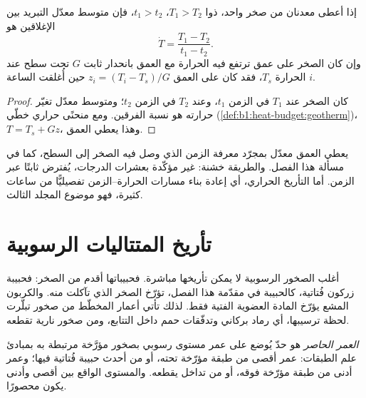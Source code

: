 \begin{proposition}\label{prop:b1:radiometric-methods:cooling}
إذا أعطى معدنان من صخر واحد، ذوا  $T_1 > T_2$،  $t_1 > t_2$، فإن متوسط معدّل التبريد بين الإغلاقين هو
\[
  \dot T = \frac{T_1 - T_2}{t_1 - t_2}.
\]
وإن كان الصخر على عمق ترتفع فيه الحرارة مع العمق بانحدار ثابت $G$ تحت سطح عند الحرارة $T_s$، فقد كان على العمق $z_i
= (T_i - T_s)/G$ حين أُغلقت الساعة $i$.
\end{proposition}

\begin{proof}
كان الصخر عند $T_1$ في الزمن $t_1$، وعند $T_2$ في الزمن $t_2$؛ ومتوسط معدّل تغيّر حرارته هو نسبة الفرقين. ومع منحنًى حراري خطّي (\cref{def:b1:heat-budget:geotherm})، $T = T_s + G z$، وهذا يعطي العمق.
\end{proof}

يعطي العمق معدّل  بمجرّد معرفة الزمن الذي وصل فيه الصخر إلى السطح، كما في مسألة هذا الفصل. والطريقة خشنة:  غير مؤكّدة بعشرات الدرجات،  يُفترض ثابتًا عبر الزمن. أما التأريخ الحراري، أي إعادة بناء مسارات الحرارة–الزمن تفصيليًّا من ساعات كثيرة، فهو موضوع المجلد الثالث.

\section{تأريخ المتتاليات الرسوبية}\label{sec:b1:radiometric-methods:sediments}

أغلب الصخور الرسوبية لا يمكن تأريخها مباشرة. فحبيباتها أقدم من الصخر: فحبيبة زركون فُتاتية، كالحبيبة في مقدّمة هذا الفصل، تؤرّخ الصخر الذي تآكلت منه. والكربون المشع يؤرّخ المادة العضوية الفتية فقط. لذلك تأتي أعمار المخطّط من صخور تبلّرت لحظة ترسيبها، أي رماد بركاني وتدفّقات حمم داخل التتابع، ومن صخور نارية تقطعه.

\begin{definition}\label{def:b1:radiometric-methods:bracketing}
\emph{العمر الحاصر} هو حدّ يُوضع على عمر مستوى رسوبي بصخور مؤرَّخة مرتبطة به بمبادئ علم الطبقات: عمر أقصى من طبقة مؤرّخة تحته، أو من أحدث حبيبة فُتاتية فيها؛ وعمر أدنى من طبقة مؤرّخة فوقه، أو من تداخل يقطعه. والمستوى الواقع بين أقصى وأدنى يكون محصورًا.
\end{definition}

